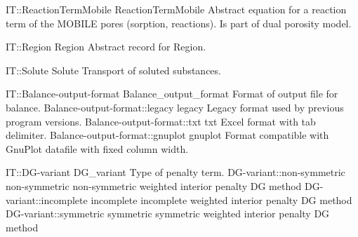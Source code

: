 \begin{AbstractType}
	{IT::ReactionTermMobile}
	{ReactionTermMobile}
	{}
	{{{Abstract equation for a reaction term of the MOBILE pores (sorption, reactions). Is part of dual porosity model.}}}
\end{AbstractType}
\begin{AbstractType}
	{IT::Region}
	{Region}
	{}
	{{{Abstract record for Region.}}}
\end{AbstractType}
\begin{AbstractType}
	{IT::Solute}
	{Solute}
	{}
	{{{Transport of soluted  substances.}}}
\end{AbstractType}
\begin{SelectionType}
	{IT::Balance-output-format}
	{Balance{\_}output{\_}format}
	{{{Format of output file for balance.}}}
		\SelectionItem
			{Balance-output-format::legacy}
			{legacy}
			{{{Legacy format used by previous program versions.}}}
		\SelectionItem
			{Balance-output-format::txt}
			{txt}
			{{{Excel format with tab delimiter.}}}
		\SelectionItem
			{Balance-output-format::gnuplot}
			{gnuplot}
			{{{Format compatible with GnuPlot datafile with fixed column width.}}}
\end{SelectionType}
\begin{SelectionType}
	{IT::DG-variant}
	{DG{\_}variant}
	{{{Type of penalty term.}}}
		\SelectionItem
			{DG-variant::non-symmetric}
			{non-symmetric}
			{{{non-symmetric weighted interior penalty DG method}}}
		\SelectionItem
			{DG-variant::incomplete}
			{incomplete}
			{{{incomplete weighted interior penalty DG method}}}
		\SelectionItem
			{DG-variant::symmetric}
			{symmetric}
			{{{symmetric weighted interior penalty DG method}}}
\end{SelectionType}
